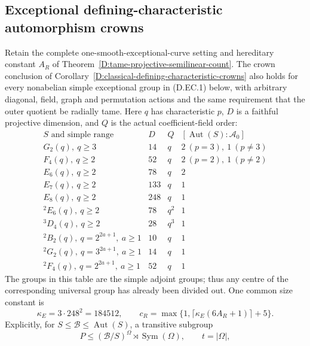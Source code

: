 \subsection{Exceptional defining-characteristic automorphism crowns}

\begin{corollary}
\label{D:exceptional-defining-characteristic-crowns}
Retain the complete one-smooth-exceptional-curve setting and
hereditary constant $A_R$ of
Theorem~\ref{D:tame-projective-semilinear-count}.
The crown conclusion of
Corollary~\ref{D:classical-defining-characteristic-crowns}
also holds for every nonabelian simple exceptional group in
(D.EC.1) below, with arbitrary diagonal, field, graph and
permutation actions and the same requirement that the outer
quotient be radially tame. Here $q$ has characteristic $p$,
$D$ is a faithful projective dimension, and $Q$ is the actual
coefficient-field order:
\[
\begin{array}{c|c|c|c}
 S\text{ and simple range}&D&Q&
       [\operatorname{Aut}(S):\mathcal A_0]\\ \hline
 G_2(q),\ q\geq3&14&q&2\ (p=3),\ 1\ (p\ne3)\\
 F_4(q),\ q\geq2&52&q&2\ (p=2),\ 1\ (p\ne2)\\
 E_6(q),\ q\geq2&78&q&2\\
 E_7(q),\ q\geq2&133&q&1\\
 E_8(q),\ q\geq2&248&q&1\\
 {}^2E_6(q),\ q\geq2&78&q^2&1\\
 {}^3D_4(q),\ q\geq2&28&q^3&1\\
 {}^2B_2(q),\ q=2^{2a+1},\ a\geq1&10&q&1\\
 {}^2G_2(q),\ q=3^{2a+1},\ a\geq1&14&q&1\\
 {}^2F_4(q),\ q=2^{2a+1},\ a\geq1&52&q&1
\end{array}                                                    \tag{D.EC.1}
\]
The groups in this table are the simple adjoint groups;
thus any centre of the corresponding universal group has
already been divided out. One common size constant is
\[
 \kappa_E=3\cdot248^2=184512,
 \qquad
 c_R=\max\{1,\lceil\kappa_E(6A_R+1)\rceil+5\}.            \tag{D.EC.2}
\]
Explicitly, for $S\leq\mathcal B\leq\operatorname{Aut}(S)$,
a transitive subgroup
\[
 P\leq(\mathcal B/S)^\Omega\rtimes\operatorname{Sym}(\Omega),
 \qquad t=|\Omega|,
\]
\end{corollary}
